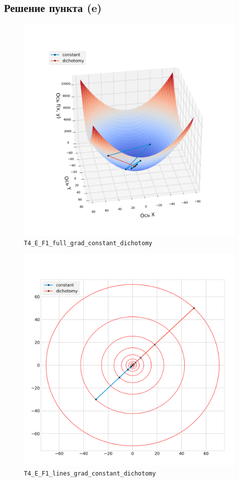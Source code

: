 \documentclass[12pt, a4paper, oneside, final]{article}
\begin{document}
	\subsection*{Решение пункта (e)}
	\begin{center}
		\begin{figure}[H]
			\centering
			\includegraphics[scale=0.68]{Image/T4_E_F1_full_grad_constant_dichotomy.png}
			\caption*{\texttt{T4\_E\_F1\_full\_grad\_constant\_dichotomy}}
		\end{figure}
		\begin{figure}[H]
			\centering
			\includegraphics[scale=0.68]{Image/T4_E_F1_lines_grad_constant_dichotomy.png}
			\caption*{\texttt{T4\_E\_F1\_lines\_grad\_constant\_dichotomy}}
		\end{figure}
	\end{center}
\end{document}
